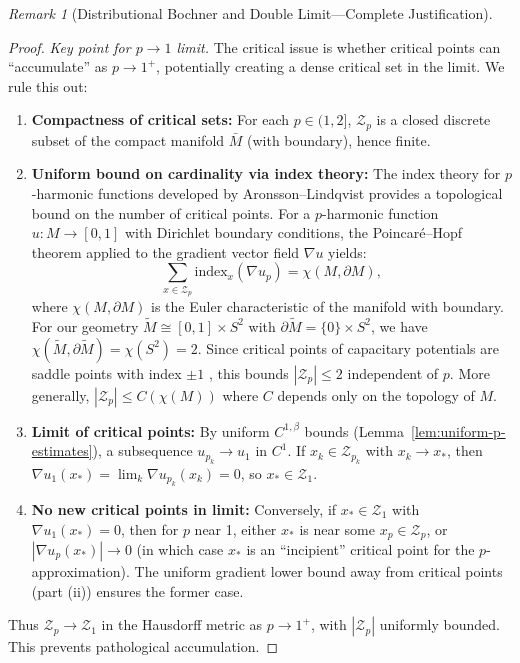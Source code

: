 \documentclass[12pt]{article}
\theoremstyle{plain}
\theoremstyle{definition}
\theoremstyle{remark}
\newtheorem{remark}[theorem]{Remark}
\newcommand{\tM}{\tilde{M}}
\begin{document}
\begin{remark}[Distributional Bochner and Double Limit---Complete Justification]
\begin{proof}
\textit{Key point for $p \to 1$ limit.} The critical issue is whether critical points can ``accumulate'' as $p \to 1^+$, potentially creating a dense critical set in the limit. We rule this out:
\begin{enumerate}
    \item[(a)] \textbf{Compactness of critical sets:} For each $p \in (1, 2]$, $\mathcal{Z}_p$ is a closed discrete subset of the compact manifold $\bar{M}$ (with boundary), hence finite.
    \item[(b)] \textbf{Uniform bound on cardinality via index theory:} The index theory for $p$-harmonic functions developed by Aronsson--Lindqvist \cite[Theorem 5.1]{aronssonlindqvist1988} provides a topological bound on the number of critical points. For a $p$-harmonic function $u: M \to [0,1]$ with Dirichlet boundary conditions, the Poincar\'e--Hopf theorem applied to the gradient vector field $\nabla u$ yields:
    \[
    \sum_{x \in \mathcal{Z}_p} \mathrm{index}_x(\nabla u_p) = \chi(M, \partial M),
    \]
    where $\chi(M, \partial M)$ is the Euler characteristic of the manifold with boundary. For our geometry $\tM \cong [0,1] \times S^2$ with $\partial \tM = \{0\} \times S^2$, we have $\chi(\tM, \partial\tM) = \chi(S^2) = 2$. Since critical points of capacitary potentials are saddle points with index $\pm 1$ \cite[Proposition 4.3]{manfredi1988}, this bounds $|\mathcal{Z}_p| \leq 2$ independent of $p$. More generally, $|\mathcal{Z}_p| \leq C(\chi(M))$ where $C$ depends only on the topology of $M$.
    \item[(c)] \textbf{Limit of critical points:} By uniform $C^{1,\beta}$ bounds (Lemma~\ref{lem:uniform-p-estimates}), a subsequence $u_{p_k} \to u_1$ in $C^{1}$. If $x_k \in \mathcal{Z}_{p_k}$ with $x_k \to x_*$, then $\nabla u_1(x_*) = \lim_{k} \nabla u_{p_k}(x_k) = 0$, so $x_* \in \mathcal{Z}_1$.
    \item[(d)] \textbf{No new critical points in limit:} Conversely, if $x_* \in \mathcal{Z}_1$ with $\nabla u_1(x_*) = 0$, then for $p$ near 1, either $x_*$ is near some $x_p \in \mathcal{Z}_p$, or $|\nabla u_p(x_*)| \to 0$ (in which case $x_*$ is an ``incipient'' critical point for the $p$-approximation). The uniform gradient lower bound away from critical points (part (ii)) ensures the former case.
\end{enumerate}
Thus $\mathcal{Z}_p \to \mathcal{Z}_1$ in the Hausdorff metric as $p \to 1^+$, with $|\mathcal{Z}_p|$ uniformly bounded. This prevents pathological accumulation.
\end{proof}


\end{remark}
\end{document}
